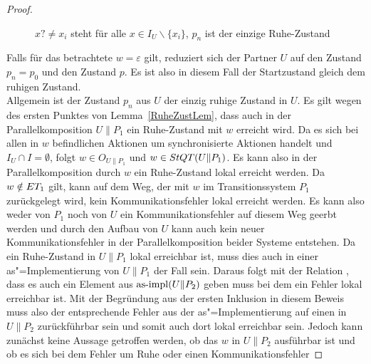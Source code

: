 \begin{proof}
\begin{figure} [h!tbp]
\begin{center}
    \caption{$x?\neq x_i$ steht für alle $x\in I_U\backslash\{x_i\}$, $p_n$
    ist der einzige Ruhe-Zustand}
  \label{UohneEmitI}
  \end{center}
  \end{figure}
  Falls für das betrachtete $w=\varepsilon$ gilt, reduziert sich der Partner
  $U$ auf den Zustand $p_n=p_0$ und den Zustand $p$. Es ist also in diesem Fall
  der Startzustand gleich dem ruhigen Zustand.\\
  Allgemein ist der Zustand $p_n$ aus $U$ der einzig ruhige Zustand in $U$. Es
  gilt wegen des ersten Punktes von Lemma~\ref{RuheZustLem}, dass auch in der
  Parallelkomposition $U\|P_1$ ein Ruhe-Zustand mit $w$ erreicht wird. Da es
  sich bei allen in $w$ befindlichen Aktionen um synchronisierte Aktionen
  handelt und $I_U\cap I=\emptyset$, folgt $w\in O_{U\|P_1}$ und $w\in StQT
  (U\|P_1)$. Es kann also in der Parallelkomposition durch $w$ ein Ruhe-Zustand
  lokal erreicht werden. Da $w\notin ET _1$ gilt, kann auf dem Weg, der mit $w$
  im Transitionssystem $P_1$ zurückgelegt wird, kein Kommunikationsfehler
  lokal erreicht werden. Es kann also weder von $P_1$ noch von $U$ ein
  Kommunikationsfehler auf diesem Weg geerbt werden und durch den Aufbau von
  $U$ kann auch kein neuer Kommunikationsfehler in der Parallelkomposition
  beider Systeme entstehen. Da ein Ruhe-Zustand in $U\|P_1$ lokal erreichbar
  ist, muss dies auch in einer as"=Implementierung von $U\|P_1$ der Fall sein.
  Daraus folgt mit der Relation \QBRel{}, dass es auch ein Element aus $\mathrm{as}\text{-}\mathrm{impl}
  (U\|P_2)$ geben muss bei dem ein Fehler lokal erreichbar ist. Mit der
  Begründung aus der ersten Inklusion in diesem Beweis muss also der
  entsprechende Fehler aus der as"=Implementierung auf einen in $U\|P_2$
  zurückführbar sein und somit auch dort lokal erreichbar sein. Jedoch kann
  zunächst keine Aussage getroffen werden, ob das $w$ in $U\|P_2$ ausführbar
  ist und ob es sich bei dem Fehler um Ruhe oder einen Kommunikationsfehler

\end{proof}
